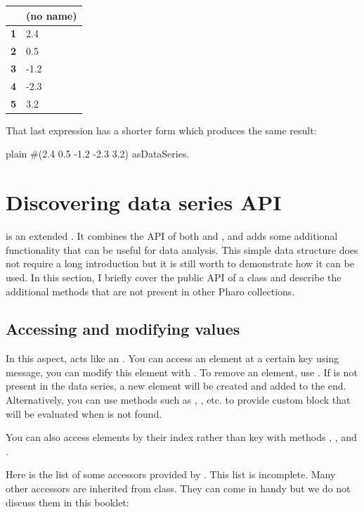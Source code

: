 \documentclass[10pt,twoside,english]{_support/latex/sbabook/sbabook}
\begin{document}
\begin{tabular}{ll}
\toprule
 & \textbf{(no name)} \\
\midrule
\textbf{1} & 2.4 \\
\textbf{2} & 0.5 \\
\textbf{3} & -1.2 \\
\textbf{4} & -2.3 \\
\textbf{5} & 3.2 \\
\bottomrule
\end{tabular}

That last expression has a shorter form which produces the same result:

\begin{displaycode}{plain}
#(2.4 0.5 -1.2 -2.3 3.2) asDataSeries.
\end{displaycode}
\section{Discovering data series API}
 is an extended . It combines the API of both  and , and adds some additional functionality that can be useful for data analysis. This simple data structure does not require a long introduction but it is still worth to demonstrate how it can be used. In this section, I briefly cover the public API of a  class and describe the additional methods that are not present in other Pharo collections.
\subsection{Accessing and modifying values}
In this aspect,  acts like an . You can access an element at a certain key using  message, you can modify this element with . To remove an element, use . If  is not present in the data series, a new element will be created and added to the end. Alternatively, you can use methods such as , , etc. to provide custom block that will be evaluated when  is not found.

You can also access elements by their index rather than key with methods , , and .

Here is the list of some accessors provided by . This list is incomplete. Many other accessors are inherited from  class. They can come in handy but we do not discuss them in this booklet:
\end{document}
